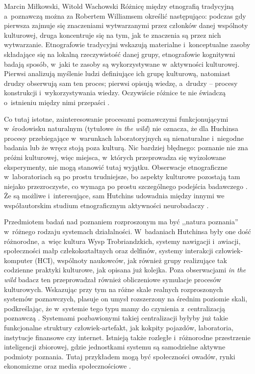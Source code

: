 \begin{artplenv2auth}{Marcin Miłkowski, Witold Wachowski}
Różnicę między etnografią tradycyjną a~poznawczą można za Robertem Williamsem określić następująco: podczas gdy pierwsza zajmuje się znaczeniami wytwarzanymi przez członków danej wspólnoty kulturowej, druga koncentruje się na tym, jak te znaczenia są przez nich wytwarzanie. Etnografowie tradycyjni wskazują materialne i~konceptualne zasoby składające się na lokalną rzeczywistość danej grupy, etnografowie kognitywni badają sposób, w~jaki te zasoby są wykorzystywane w~aktywności kulturowej. Pierwsi analizują myślenie ludzi definiujące ich grupę kulturową, natomiast drudzy obserwują sam ten proces; pierwsi opisują wiedzę, a~drudzy -- procesy konstrukcji i~wykorzystywania wiedzy. Oczywiście różnice te nie świadczą o~istnieniu między nimi przepaści
\parencite[][s.~838]{williams_using_2006}.%


Co tutaj istotne, zainteresowanie procesami poznawczymi funkcjonującymi w~środowisku naturalnym (tytułowe \textit{in the wild}) nie oznacza, że dla Huchinsa procesy przebiegające w~warunkach laboratoryjnych są nienaturalne i~niegodne badania lub że wręcz stoją poza kulturą. Nic bardziej błędnego: poznanie nie zna próżni kulturowej, więc miejsca, w~których przeprowadza się wyizolowane eksperymenty, nie mogą stanowić tutaj wyjątku. Obserwacje etnograficzne w~laboratoriach są po prostu trudniejsze, bo aspekty kulturowe pozostają tam niejako przezroczyste, co wymaga po prostu szczególnego podejścia badawczego
\parencite[][s.~66–67]{hutchins_response_1996}. %
 Że są możliwe i~interesujące, sam Hutchins udowadnia między innymi we współautorskim studium etnograficznym aktywności neurobadaczy 
\parencite[][]{alac_i_2004}.%


Przedmiotem badań nad poznaniem rozproszonym ma być ,,natura poznania'' w~różnego rodzaju systemach działalności. W~badaniach Hutchinsa były one dość różnorodne, a~więc kultura Wysp Trobriandzkich, systemy nawigacji i~awiacji, społeczności małp człekokształtnych oraz delfinów, systemy interakcji człowiek-komputer (HCI), wspólnoty naukowców, jak również grupy realizujące tak codzienne praktyki kulturowe, jak opisana już kolejka. Poza obserwacjami \textit{in the wild} badacz ten przeprowadzał również obliczeniowe symulacje procesów kulturowych. Wskazując przy tym na różne skale realnych rozproszonych systemów poznawczych, plasuje on umysł rozszerzony na średnim poziomie skali, podkreślając, że w~systemie tego typu mamy do czynienia z~centralizacją poznawczą
\parencite[][s.~37]{hutchins_cultural_2014}. %
 Systemami pozbawionymi takiej centralizacji byłyby już takie funkcjonalne struktury człowiek-artefakt, jak kokpity pojazdów, laboratoria, instytucje finansowe czy internet. Istnieją także rozległe i~różnorodne przestrzenie inteligencji zbiorowej, gdzie jednostkami systemu są samodzielne aktywne podmioty poznania. Tutaj przykładem mogą być społeczności owadów, rynki ekonomiczne oraz media społecznościowe 
\parencite[][s.~37]{hutchins_cultural_2014}.%



\end{artplenv2auth}
